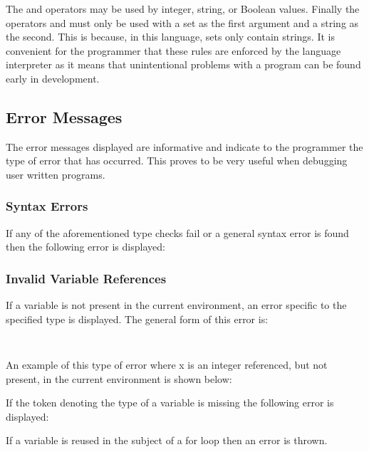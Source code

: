 \documentclass{article}
\begin{document}
The \EQ and \NEQ operators may be used by integer, string, or Boolean values. 
Finally the operators \INSERT and \SETMINUS must only be used with a set as the 
first argument and a string as the second. This is because, in this language, 
sets only contain strings. It is convenient for the programmer that these rules 
are enforced by the language interpreter as it means that unintentional 
problems with a program can be found early in development.

\newpage

\subsection{Error Messages}
The error messages displayed are informative and indicate to the programmer
the type of error that has occurred. This proves to be very useful when 
debugging user written programs.

\subsubsection{Syntax Errors}
If any of the aforementioned type checks fail or a general syntax error is 
found then the following error is displayed: 
\texttt{}

\subsubsection{Invalid Variable References}
If a variable is not present in the current environment, an error specific to 
the specified type is displayed. The general form of this error is:

\texttt{
}

An example of this type of error where x is an integer referenced, but not 
present, in the current environment is shown below:


If the token denoting the type of a variable is missing the following error is 
displayed: \texttt{}

If a variable is reused in the subject of a for loop then an error is thrown.
\texttt{}
\end{document}
